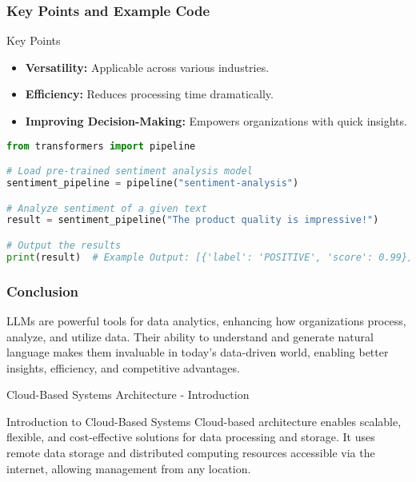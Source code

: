 \documentclass[aspectratio=169]{beamer}
\begin{document}
\begin{frame}[fragile]
    \frametitle{Key Points and Example Code}
    \begin{block}{Key Points}
        \begin{itemize}
            \item \textbf{Versatility:} Applicable across various industries.
            \item \textbf{Efficiency:} Reduces processing time dramatically.
            \item \textbf{Improving Decision-Making:} Empowers organizations with quick insights.
        \end{itemize}
    \end{block}
    \begin{lstlisting}[language=Python]
from transformers import pipeline

# Load pre-trained sentiment analysis model
sentiment_pipeline = pipeline("sentiment-analysis")

# Analyze sentiment of a given text
result = sentiment_pipeline("The product quality is impressive!")

# Output the results
print(result)  # Example Output: [{'label': 'POSITIVE', 'score': 0.99}]
    \end{lstlisting}
\end{frame}

\begin{frame}[fragile]
    \frametitle{Conclusion}
    LLMs are powerful tools for data analytics, enhancing how organizations process, analyze, and utilize data. Their ability to understand and generate natural language makes them invaluable in today's data-driven world, enabling better insights, efficiency, and competitive advantages.
\end{frame}

\begin{frame}[fragile]{Cloud-Based Systems Architecture - Introduction}
    \begin{block}{Introduction to Cloud-Based Systems}
        Cloud-based architecture enables scalable, flexible, and cost-effective solutions for data processing and storage. It uses remote data storage and distributed computing resources accessible via the internet, allowing management from any location.
    \end{block}
\end{frame}
\end{document}
